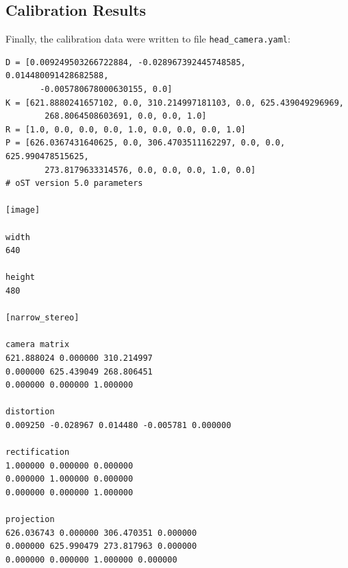 \documentclass[11pt, oneside]{article}   	%
\begin{document}
\subsection{Calibration Results}
Finally, the calibration data were written to file \verb+head_camera.yaml+:
\begin{verbatim}
D = [0.009249503266722884, -0.028967392445748585, 0.014480091428682588,
       -0.005780678000630155, 0.0]
K = [621.8880241657102, 0.0, 310.214997181103, 0.0, 625.439049296969, 
        268.8064508603691, 0.0, 0.0, 1.0]
R = [1.0, 0.0, 0.0, 0.0, 1.0, 0.0, 0.0, 0.0, 1.0]
P = [626.0367431640625, 0.0, 306.4703511162297, 0.0, 0.0, 625.990478515625, 
        273.8179633314576, 0.0, 0.0, 0.0, 1.0, 0.0]
# oST version 5.0 parameters

[image]

width
640

height
480

[narrow_stereo]

camera matrix
621.888024 0.000000 310.214997
0.000000 625.439049 268.806451
0.000000 0.000000 1.000000

distortion
0.009250 -0.028967 0.014480 -0.005781 0.000000

rectification
1.000000 0.000000 0.000000
0.000000 1.000000 0.000000
0.000000 0.000000 1.000000

projection
626.036743 0.000000 306.470351 0.000000
0.000000 625.990479 273.817963 0.000000
0.000000 0.000000 1.000000 0.000000
\end{verbatim}
\end{document}
